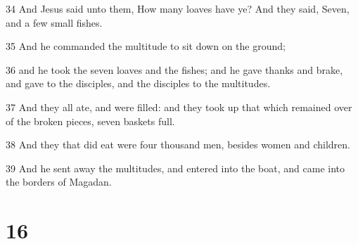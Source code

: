 \par 34 And Jesus said unto them, How many loaves have ye? And they said, Seven, and a few small fishes.
\par 35 And he commanded the multitude to sit down on the ground;
\par 36 and he took the seven loaves and the fishes; and he gave thanks and brake, and gave to the disciples, and the disciples to the multitudes.
\par 37 And they all ate, and were filled: and they took up that which remained over of the broken pieces, seven baskets full.
\par 38 And they that did eat were four thousand men, besides women and children.
\par 39 And he sent away the multitudes, and entered into the boat, and came into the borders of Magadan.

\chapter{16}

